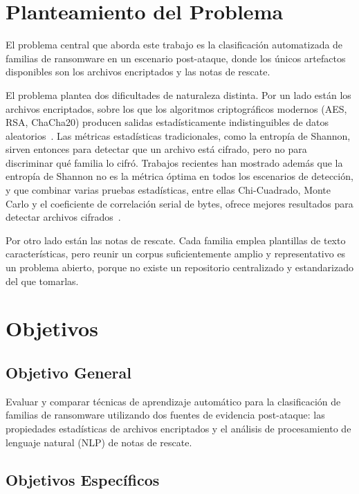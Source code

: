\section{Planteamiento del Problema}

El problema central que aborda este trabajo es la clasificación automatizada de familias de ransomware en un escenario post-ataque, donde los únicos artefactos disponibles son los archivos encriptados y las notas de rescate.

El problema plantea dos dificultades de naturaleza distinta. Por un lado están los archivos encriptados, sobre los que los algoritmos criptográficos modernos (AES, RSA, ChaCha20) producen salidas estadísticamente indistinguibles de datos aleatorios~\cite{paper_4_comparison_of_entropy, paper_3_enhancing_file_entropy}. Las métricas estadísticas tradicionales, como la entropía de Shannon, sirven entonces para detectar que un archivo está cifrado, pero no para discriminar qué familia lo cifró. Trabajos recientes han mostrado además que la entropía de Shannon no es la métrica óptima en todos los escenarios de detección, y que combinar varias pruebas estadísticas, entre ellas Chi-Cuadrado, Monte Carlo y el coeficiente de correlación serial de bytes, ofrece mejores resultados para detectar archivos cifrados~\cite{lee2022}.

Por otro lado están las notas de rescate. Cada familia emplea plantillas de texto características, pero reunir un corpus suficientemente amplio y representativo es un problema abierto, porque no existe un repositorio centralizado y estandarizado del que tomarlas.

\section{Objetivos}
\label{sec:objetivos}

\subsection{Objetivo General}

Evaluar y comparar técnicas de aprendizaje automático para la clasificación de familias de ransomware utilizando dos fuentes de evidencia post-ataque: las propiedades estadísticas de archivos encriptados y el análisis de procesamiento de lenguaje natural (NLP) de notas de rescate.

\subsection{Objetivos Específicos}

